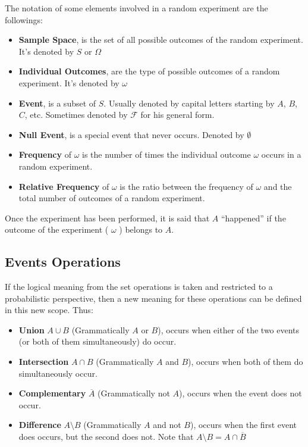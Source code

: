  The notation of some elements involved in a random experiment are the
 followings:
 \begin{itemize}
     \item \textbf{Sample Space}, is the set of all possible outcomes of the
     random experiment. It's denoted by $S$ or $\Omega$
     \item \textbf{Individual Outcomes}, are the type of possible outcomes of a
     random experiment. It's denoted by $\omega$
     \item \textbf{Event}, is a subset of $S$. Usually denoted by capital
        letters starting by $A$, $B$, $C$, etc. Sometimes denoted by
        $\mathcal{F}$ for his general form. 
     \item \textbf{Null Event}, is a special event that never occurs. Denoted by
     $\emptyset$
     \item \textbf{Frequency} of $\omega$ is the number of times the individual
     outcome $\omega$ occurs in a random experiment.
     \item \textbf{Relative Frequency} of $\omega$ is the ratio between the
     frequency of $\omega$ and the total number of outcomes of a random
     experiment.
 \end{itemize}

 Once the experiment has been performed, it is said that $A$ “happened” if the
 outcome of the experiment ( $\omega$ ) belongs to $A$. 

 \subsection{Events Operations}
If the logical meaning from the set operations is taken and restricted to a
probabilistic perspective, then a new meaning for these operations can be
defined in this new scope. Thus:
\begin{itemize}
    \item \textbf{Union} $A \cup B$ (Grammatically $A$ or $B$), occurs when
    either of the two events (or both of them simultaneously) do occur.
    \item \textbf{Intersection} $A \cap B$ (Grammatically $A$ and $B$), occurs
    when both of them do simultaneously occur.
    \item \textbf{Complementary} $\overline{A}$ (Grammatically not $A$), occurs
    when the event does not occur.
    \item \textbf{Difference} $A \setminus B$ (Grammatically $A$ and not $B$),
                occurs when the first event does occurs, but the second does
                not. Note that $A \setminus B = A \cap \overline{B}$
\end{itemize}

